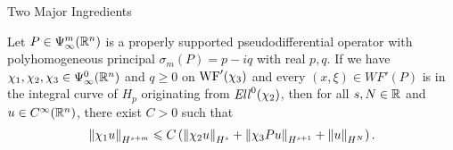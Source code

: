 \documentclass{beamer}
\begin{document}
\begin{frame}{Two Major Ingredients}
\begin{theorem} \label{theorem: propagation of singularity estimates}
    Let $P \in \Psi^{m}_{\infty}(\R^n)$ is a properly supported pseudodifferential operator with polyhomogeneous principal $\sigma_m(P) = p - iq$ with real $p, q$. If we have $\chi_1, \chi_2, \chi_3 \in \Psi^{0}_{\infty}(\R^n)$ and $q \geq 0$ on $\WF'(\chi_3)$ and every $(x, \xi) \in WF'(P)$ is in the integral curve of $H_p$ originating from $\Ell^0(\chi_2)$, then for all $s, N \in \R$ and $u \in C^\infty(\R^n)$, there exist $C > 0$ such that 
    \begin{align*}
    \norm[\chi_1 u]_{H^{s + m}} \leq C\brac{\norm[\chi_2 u]_{H^s} + \norm[\chi_3 Pu]_{H^{s + 1}} + \norm[u]_{H^{N}}}. 
    \end{align*}
\end{theorem}
\begin{center}
\end{center}
\end{frame} 
\end{document}
